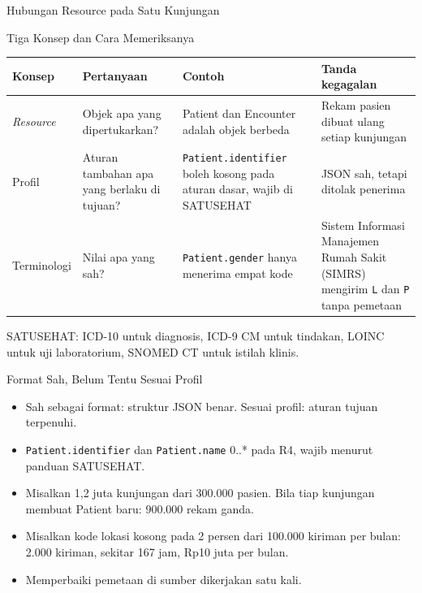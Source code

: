 \documentclass[aspectratio=169, table, 12pt]{beamer}
\begin{document}
\begin{frame}{{\Large Hubungan Resource pada Satu Kunjungan}}
  \centering
\end{frame}

\begin{frame}{{\Large Tiga Konsep dan Cara Memeriksanya}}
  \footnotesize
  \begin{tabularx}{\textwidth}{>{\raggedright\arraybackslash}p{1.9cm}
      >{\raggedright\arraybackslash}X >{\raggedright\arraybackslash}X >{\raggedright\arraybackslash}X}
    \hline
    \textbf{Konsep} & \textbf{Pertanyaan} & \textbf{Contoh} & \textbf{Tanda kegagalan} \\ \hline
    \textit{Resource} & Objek apa yang dipertukarkan? & Patient dan Encounter adalah objek berbeda & Rekam pasien dibuat ulang setiap kunjungan \\ \hline
    Profil & Aturan tambahan apa yang berlaku di tujuan? & \texttt{Patient.identifier} boleh kosong pada aturan dasar, wajib di SATUSEHAT & JSON sah, tetapi ditolak penerima \\ \hline
    Terminologi & Nilai apa yang sah? & \texttt{Patient.gender} hanya menerima empat kode & Sistem Informasi Manajemen Rumah Sakit (SIMRS) mengirim \texttt{L} dan \texttt{P} tanpa pemetaan \\ \hline
  \end{tabularx}

  \vspace{8pt}
  \small SATUSEHAT: ICD-10 untuk diagnosis, ICD-9 CM untuk tindakan, LOINC untuk uji laboratorium, SNOMED CT untuk istilah klinis.
\end{frame}

\begin{frame}{{\Large Format Sah, Belum Tentu Sesuai Profil}}
  \vspace{8pt}
  \begin{itemize}
    \item Sah sebagai format: struktur JSON benar. Sesuai profil: aturan tujuan terpenuhi.
    \item \texttt{Patient.identifier} dan \texttt{Patient.name} 0..* pada R4, wajib menurut panduan SATUSEHAT.
    \item Misalkan 1,2 juta kunjungan dari 300.000 pasien. Bila tiap kunjungan membuat Patient baru: 900.000 rekam ganda.
    \item Misalkan kode lokasi kosong pada 2 persen dari 100.000 kiriman per bulan: 2.000 kiriman, sekitar 167 jam, Rp10 juta per bulan.
    \item Memperbaiki pemetaan di sumber dikerjakan satu kali.
  \end{itemize}
\end{frame}
\end{document}
